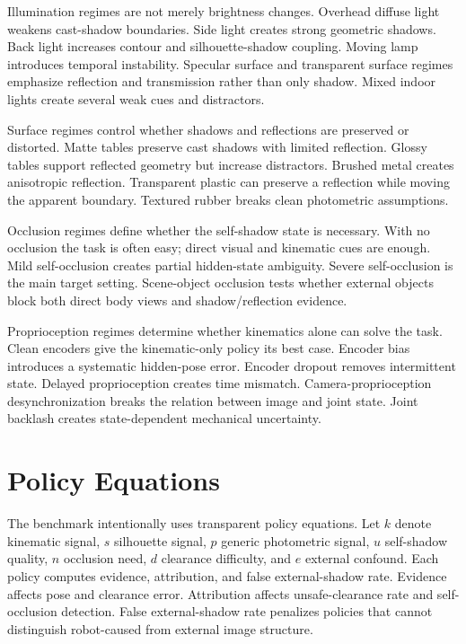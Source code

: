 \documentclass{article}
\begin{document}
Illumination regimes are not merely brightness changes. Overhead diffuse light weakens cast-shadow boundaries. Side light creates strong geometric shadows. Back light increases contour and silhouette-shadow coupling. Moving lamp introduces temporal instability. Specular surface and transparent surface regimes emphasize reflection and transmission rather than only shadow. Mixed indoor lights create several weak cues and distractors.

Surface regimes control whether shadows and reflections are preserved or distorted. Matte tables preserve cast shadows with limited reflection. Glossy tables support reflected geometry but increase distractors. Brushed metal creates anisotropic reflection. Transparent plastic can preserve a reflection while moving the apparent boundary. Textured rubber breaks clean photometric assumptions.

Occlusion regimes define whether the self-shadow state is necessary. With no occlusion the task is often easy; direct visual and kinematic cues are enough. Mild self-occlusion creates partial hidden-state ambiguity. Severe self-occlusion is the main target setting. Scene-object occlusion tests whether external objects block both direct body views and shadow/reflection evidence.

Proprioception regimes determine whether kinematics alone can solve the task. Clean encoders give the kinematic-only policy its best case. Encoder bias introduces a systematic hidden-pose error. Encoder dropout removes intermittent state. Delayed proprioception creates time mismatch. Camera-proprioception desynchronization breaks the relation between image and joint state. Joint backlash creates state-dependent mechanical uncertainty.

\section{Policy Equations}

The benchmark intentionally uses transparent policy equations. Let $k$ denote kinematic signal, $s$ silhouette signal, $p$ generic photometric signal, $u$ self-shadow quality, $n$ occlusion need, $d$ clearance difficulty, and $e$ external confound. Each policy computes evidence, attribution, and false external-shadow rate. Evidence affects pose and clearance error. Attribution affects unsafe-clearance rate and self-occlusion detection. False external-shadow rate penalizes policies that cannot distinguish robot-caused from external image structure.
\end{document}
